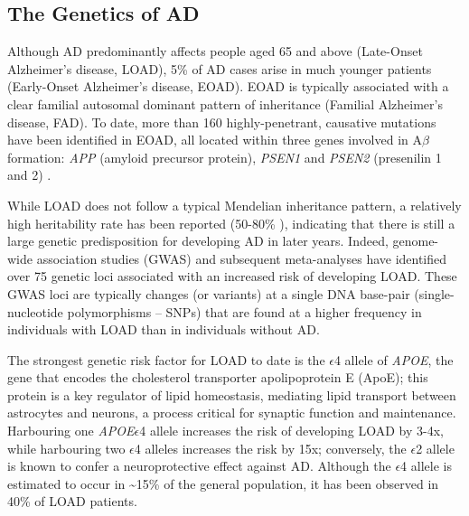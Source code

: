 \subsection{The Genetics of AD}
Although AD predominantly affects people aged 65 and above (Late-Onset Alzheimer’s disease, LOAD), 5\% of AD cases arise in much younger patients (Early-Onset Alzheimer’s disease, EOAD). EOAD is typically associated with a clear familial autosomal dominant pattern of inheritance (Familial Alzheimer’s disease, FAD)\cite{Jarmolowicz2015}. To date, more than 160 highly-penetrant, causative mutations have been identified in EOAD, all located within three genes involved in A$\beta$ formation: \textit{APP} (amyloid precursor protein), \textit{PSEN1} and \textit{PSEN2} (presenilin 1 and 2) \cite{LM2010,Chai2007}. %

While LOAD does not follow a typical Mendelian inheritance pattern, a relatively high heritability rate has been reported (50-80\% \cite{Gatz2006}), indicating that there is still a large genetic predisposition for developing AD in later years. Indeed, genome-wide association studies (GWAS) and subsequent meta-analyses \cite{Bellenguez2020,Naj2020,Kunkle2019,Jansen2019,Lambert2013,Naj2011,Hollingworth2011,Harold2009,Lambert2009,Bertram2008} have identified over 75 genetic loci associated with an increased risk of developing LOAD. These GWAS loci are typically changes (or variants) at a single DNA base-pair (single-nucleotide polymorphisms – SNPs) that are found at a higher frequency in individuals with LOAD than in individuals without AD. 

The strongest genetic risk factor for LOAD to date is the $\epsilon$4 allele of \textit{APOE}\cite{Lambert2013}, the gene that encodes the cholesterol transporter apolipoprotein E (ApoE); this protein is a key regulator of lipid homeostasis, mediating lipid transport between astrocytes and neurons, a process critical for synaptic function and maintenance\cite{DH2001}. Harbouring one \textit{APOE}$\epsilon$4 allele increases the risk of developing LOAD by 3-4x, while harbouring two $\epsilon$4 alleles increases the risk by 15x\cite{Farrer1997}; conversely, the $\epsilon$2 allele is known to confer a neuroprotective effect against AD\cite{Nagy1995,EH1994}. Although the $\epsilon$4 allele is estimated to occur in \textasciitilde 15\% of the general population, it has been observed in 40\% of LOAD patients\cite{Farrer1997}. 

